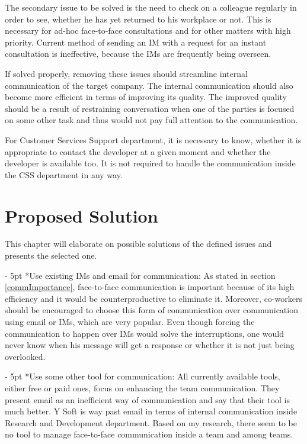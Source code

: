 \documentclass[11pt,singleside]{myfithesis2}
\makeatletter
\renewcommand\paragraph{
   \vspace{-10pt}
   \@startsection{paragraph}{4}{0mm}
      {\baselineskip}
      {- 5pt}
      {\normalfont\normalsize\bfseries}
}
\makeatother
\begin{document}
The secondary issue to be solved is the need to check on a colleague regularly in order to see, whether he has yet returned to his workplace or not. This is necessary for ad-hoc face-to-face consultations and for other matters with high priority. Current method of sending an IM with a request for an instant consultation is ineffective, because the IMs are frequently being overseen.

If solved properly, removing these issues should streamline internal communication of the target company. The internal communication should also become more efficient in terms of improving its quality. The improved quality should be a result of restraining conversation when one of the parties is focused on some other task and thus would not pay full attention to the communication.

For Customer Services Support department, it is necessary to know, whether it is appropriate to contact the developer at a given moment and whether the developer is available too. It is not required to handle the communication inside the CSS department in any way.


\chapter{Proposed Solution}
This chapter will elaborate on possible solutions of the defined issues and presents the selected one.

\paragraph*{Use existing IMs and email for communication: } As stated in section \ref{commImportance}, face-to-face communication is important because of its high efficiency and it would be counterproductive to eliminate it. Moreover, co-workers should be encouraged to choose this form of communication over communication using email or IMs, which are very popular. Even though forcing the communication to happen over IMs would solve the interruptions, one would never know when his message will get a response or whether it is not just being overlooked.

\paragraph*{Use some other tool for communication: } All currently available tools, either free or paid ones, focus on enhancing the team communication. They present email as an inefficient way of communication and say that their tool is much better. Y Soft is way past email in terms of internal communication inside Research and Development department. Based on my research, there seem to be no tool to manage face-to-face communication inside a team and among teams.
\end{document}
